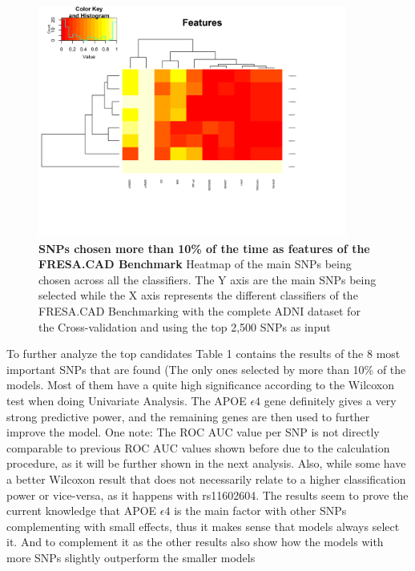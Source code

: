 \begin{figure}[!ht]
\centerline{\includegraphics[width=4in]{images/results/fresaSNPs.png}}
\caption{{\bf SNPs chosen more than 10\% of the time as features of the FRESA.CAD Benchmark} 
Heatmap of the main SNPs being chosen across all the classifiers. The Y axis are the main SNPs being selected while the X axis represents the different classifiers of the FRESA.CAD Benchmarking with the complete ADNI dataset for the Cross-validation and using the top 2,500 SNPs as input}
\label{fig20}
\end{figure}
 
 
To further analyze the top candidates Table 1 contains the results of the 8 most important SNPs that are found (The only ones selected by more than 10\% of the models. Most of them have a quite high significance according to the Wilcoxon test when doing Univariate Analysis. The APOE $\epsilon4$ gene definitely gives a very strong predictive power, and the remaining genes are then used to further improve the model. One note: The ROC AUC value per SNP is not directly comparable to previous ROC AUC values shown before due to the calculation procedure, as it will be further shown in the next analysis. Also, while some have a better Wilcoxon result that does not necessarily relate to a higher classification power or vice-versa, as it happens with rs11602604. The results seem to prove the current knowledge that APOE $\epsilon4$ is the main factor with other SNPs complementing with small effects, thus it makes sense that models always select it. And to complement it as the other results also show how the models with more SNPs slightly outperform the smaller models

